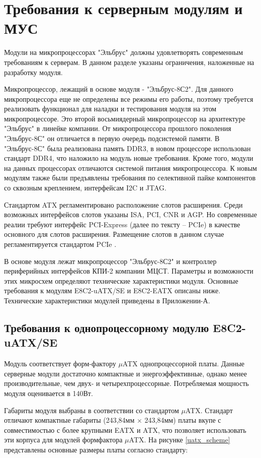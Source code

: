 \section{Требования к серверным модулям и МУС}\label{tz}

Модули на микропроцессорах "Эльбрус" должны удовлетворять современным требованиям к серверам. В данном разделе указаны ограничения, наложенные на разработку модуля.

Микропроцессор, лежащий в основе модуля - "Эльбрус-8С2". Для данного микропроцессора еще не определены все режимы его работы, поэтому требуется реализовать функционал для наладки и тестирования модуля на этом микропроцессоре. Это второй восьмиядерный микропроцессор на архитектуре "Эльбрус" в линейке компании. От микропроцессора прошлого поколения "Эльбрус-8С" он отличается в первую очередь подсистемой памяти. В "Эльбрус-8С" была реализована память DDR3, в новом процессоре использован стандарт DDR4, что наложило на модуль новые требования. Кроме того, модули на данных процессорах отличаются системой питания микропроцессора. К новым модулям также были предъявлены требования по селективной пайке компонентов со сквозным креплением, интерфейсам I2C и JTAG.


Стандартом ATX регламентировано расположение слотов расширения. Среди возможных интерфейсов слотов указаны ISA, PCI, CNR и AGP. Но современные реалии требуют интерфейс PCI-Express (далее по тексту -- PCIe) в качестве основного для слотов расширения. Размещение слотов в данном случае регламентируется стандартом PCIe \cite{pcie_standart}.

В основе модуля лежат микропроцессор "Эльбрус-8С2" и контроллер периферийных интерфейсов КПИ-2 компании МЦСТ. Параметры и возможности этих микросхем определяют технические характеристики модуля. Основные требования к модулям E8C2-uATX/SE и E8C2-EATX описаны ниже. Технические характеристики модулей приведены в Приложении-А.

\subsection{Требования к однопроцессорному модулю E8C2-uATX/SE}

Модуль соответствует форм-фактору $\mu$ATX однопроцессорной платы. Данные серверные модули достаточно компактные и энергоэффективные, однако менее производительные, чем двух- и четырехпроцессорные. Потребляемая мощность модуля оценивается в 140Вт.


Габариты модуля выбраны в соответствии со стандартом $\mu$ATX.\cite{uatx_standart} Стандарт отличают компактные габариты (243,84мм $\times$ 243,84мм) платы вкупе с совместимостью с более крупными EATX и ATX, что позволяет использовать эти корпуса для модулей формфактора $\mu$ATX. На рисунке \ref{uatx_scheme} представлены основные размеры платы согласно стандарту:

